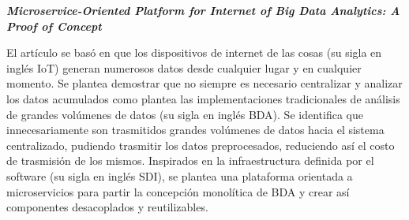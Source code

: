 
\textbf{\emph{Microservice-Oriented Platform for Internet of Big
Data Analytics: A Proof of Concept}} \cite{li_microservice-oriented_2019} 
 
El artículo se basó en que los dispositivos de internet de las cosas (su sigla en inglés IoT) generan numerosos datos desde cualquier lugar y en cualquier momento. Se plantea demostrar que no siempre es necesario centralizar y analizar los datos acumulados como plantea las implementaciones tradicionales de análisis de grandes volúmenes de datos (su sigla en inglés BDA).
Se identifica que innecesariamente son trasmitidos grandes volúmenes de datos hacia el sistema centralizado, pudiendo trasmitir los datos preprocesados, reduciendo así el costo de trasmisión de los mismos. Inspirados en la infraestructura definida por el software (su sigla en inglés SDI), se plantea una plataforma orientada a microservicios para partir la concepción monolítica de BDA y crear así componentes desacoplados y reutilizables.
